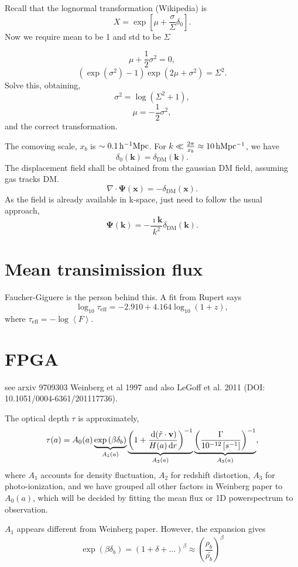 \documentclass{paper}
\begin{document}
Recall that the lognormal transformation (Wikipedia) is
\[
    X = \exp\left[\mu + \frac{\sigma}{\Sigma}
    \delta_0\right].
\]
Now we require mean to be 1 and std to be $\Sigma$

\[
    \mu + \frac{1}{2}\sigma^2 = 0,
\]
\[
    \left(\exp (\sigma^2)  - 1\right) \exp(2\mu + \sigma ^2)
    = \Sigma^2.
\]
Solve this, obtaining,
\[
    \sigma^2 = \log (\Sigma^2 + 1),
\]
\[
    \mu = - \frac{1}{2} \sigma^2,
\]
and the correct transformation.

The comoving scale, $x_b$ is $\sim \unit[0.1]{h^{-1}Mpc}$.
For $k \ll \frac{2 \pi}{x_b} \approx \unit[10]{h
    Mpc^{-1}}$, we have
\[
    \delta_0(\mathbf{k}) = \delta_\mathrm{DM}(\mathbf{k}) .
\]
The displacement field shall be obtained from the gaussian
DM field, assuming gas tracks DM.
\[
    \nabla \cdot \mathbf{\Psi}(\mathbf{x}) =
    -\delta_\mathrm{DM}(\mathbf{x}) .
\]
As the field is already available in k-space, just need to
follow the usual approach,
\[
    \mathbf{\Psi}(\mathbf{k}) = 
    -\frac{\imath \mathbf{k}}{k^2} \delta_\mathrm{DM}(\mathbf{k}) .
\]
\section{Mean transimission flux}
Faucher-Giguere is the person behind this. A fit from Rupert
says
\[
        \log_{10} \tau_\mathrm{eff} = 
          -2.910 + 4.164 \log_{10} (1 + z),
\]
where $\tau_\mathrm{eff} = - \log \left<F\right> $.
\section{FPGA}
see arxiv 9709303 Weinberg et al 1997 and also  LeGoff et
al. 2011 (DOI: 10.1051/0004-6361/201117736).

The optical depth $\tau$ is approximately,
\[  \tau(a) = 
    A_0(a)
    \underbrace{
        \exp \left(\beta \delta_b \right)
    }_{A_1(a)}
    \underbrace{
        \left(1 + 
        \frac{\diff ( \hat{r} \cdot \mathbf{v})}
        {H(a) \diff r } \right)^{-1}
    }_{A_2(a)}
    \underbrace{
        \left(\frac{\Gamma}{\unit[10^{-12}][s^{-1}]}
        \right)^{-1}
    }_{A_3(a)}
    ,
\] where $A_1$ accounts for density fluctuation, 
         $A_2$ for redshift distortion, 
         $A_3$ for photo-ionization, 
   and we have grouped all other factors in Weinberg paper to $A_0(a)$, 
   which will be decided by fitting the mean flux or 1D
   powerspectrum to observation.

   $A_1$ appears different from Weinberg paper. However, the
   expansion gives
   \[ 
     \exp \left( \beta \delta_b \right)
     = (1 + \delta + \dots)^\beta
     \approx \left(\frac{\rho_b}{\bar{\rho_b}}\right)^\beta
   \]
\end{document}
